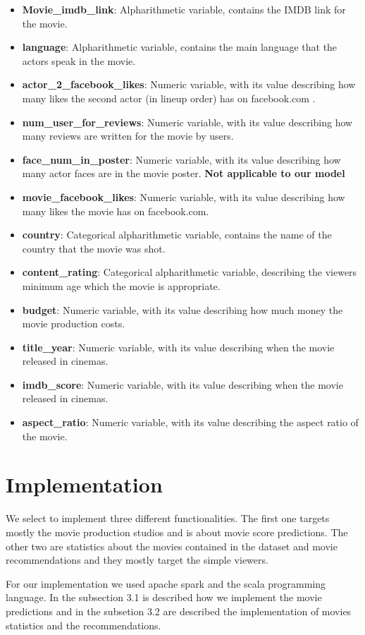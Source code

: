 \documentclass[letterpaper,twocolumn,10pt]{article}
\begin{document}
\begin{itemize}
\item \textbf{Movie\_imdb\_link}: Alpharithmetic variable, contains the IMDB link for the movie. 
\item \textbf{language}: Alpharithmetic variable, contains the main language that the actors speak in the movie.
\item \textbf{actor\_2\_facebook\_likes}: Numeric variable, with its value describing how many likes the second actor (in lineup order) has on facebook.com . 
\item \textbf{num\_user\_for\_reviews}: Numeric variable, with its value describing how many reviews are written for the movie by users.
\item \textbf{face\_num\_in\_poster}: Numeric variable, with its value describing how many actor faces are in the movie poster. \textbf{Not applicable to our model}
\item \textbf{movie\_facebook\_likes}: Numeric variable, with its value describing how many likes the movie has on facebook.com.
\item \textbf{country}: Categorical alpharithmetic variable, contains the name of the country that the movie was shot.
\item \textbf{content\_rating}:  Categorical alpharithmetic variable, describing the viewers minimum age which the movie is appropriate.
\item \textbf{budget}: Numeric variable, with its value describing how much money the movie production costs.
\item \textbf{title\_year}: Numeric variable, with its value describing when the movie released in cinemas.
\item \textbf{imdb\_score}: Numeric variable, with its value describing when the movie released in cinemas.
\item \textbf{aspect\_ratio}: Numeric variable, with its value describing the aspect ratio of the movie.
\end{itemize}


\section{Implementation}
We select to implement three different functionalities. The first one targets mostly the movie production studios and is about movie score predictions. The other two are statistics about the movies contained in the dataset and movie recommendations and they mostly target the simple viewers. \par 
For our implementation we used apache spark and the scala programming language. In the subsection 3.1 is described how we implement the movie predictions and in the subsetion 3.2 are described the implementation of movies statistics and the recommendations.
\end{document}
